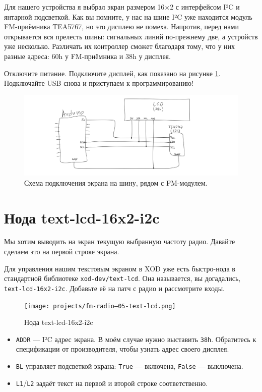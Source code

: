 Для нашего устройства я выбрал экран размером 16×2 с интерфейсом I²C и янтарной подсветкой. Как вы помните, у нас на шине I²C уже находится модуль FM-приёмника TEA5767, но это дисплею не помеха. Напротив, перед нами открывается вся прелесть шины: сигнальных линий по-прежнему две, а устройств уже несколько. Различать их контроллер сможет благодаря тому, что у них разные адреса: 60h у FM-приёмника и 38h у дисплея.

Отключите питание. Подключите дисплей, как показано на рисунке \ref{fig:text-lcd-radio-wiring}. Подключайте USB снова и приступаем к программированию!

\begin{figure}
  \centering
  \includegraphics{sketches/text-lcd-radio-wiring}
  \caption{Схема подключения экрана на шину, рядом с FM-модулем.}
  \label{fig:text-lcd-radio-wiring}
\end{figure}

\section{Нода text-lcd-16x2-i2c}

Мы хотим выводить на экран текущую выбранную частоту радио. Давайте сделаем это на первой строке экрана.

Для управления нашим текстовым экраном в XOD уже есть быстро-нода в стандартной библиотеке \texttt{xod-dev/text-lcd}. Она называется, вы догадались, \texttt{text-lcd-16x2-i2c}. Добавьте её на патч с радио и рассмотрите входы.

\begin{figure}
  \centering
  \texttt{[image: projects/fm-radio--05-text-lcd.png]}
  \caption{Нода text-lcd-16x2-i2c}
\end{figure}

\begin{itemize}
  \item \texttt{ADDR} — I²C адрес экрана. В моём случае нужно выставить \texttt{38h}. Обратитесь к спецификации от производителя, чтобы узнать адрес своего дисплея.
  \item \texttt{BL} управляет подсветкой экрана: \texttt{True} — включена, \texttt{False} — выключена.
  \item \texttt{L1}/\texttt{L2} задаёт текст на первой и второй строке соответственно.
\end{itemize}

